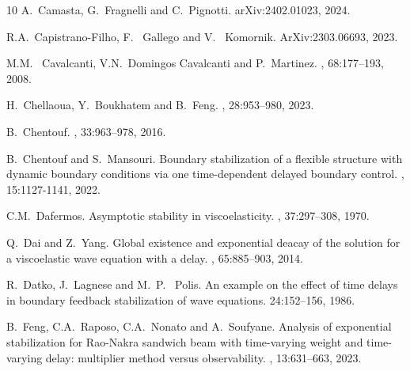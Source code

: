 \documentclass[11pt]{article}
\begin{document}
\begin{thebibliography}{10}
{\sc A.~Camasta, G.~Fragnelli and C.~Pignotti.}
 arXiv:2402.01023, 2024.

{\sc R.A.~Capistrano-Filho, F.~ Gallego and V.~ Komornik.}
  ArXiv:2303.06693,
2023.

{\sc M.M.~ Cavalcanti, V.N.~Domingos Cavalcanti and P.~Martinez.}
, 68:177--193, 2008.

{\sc H.~Chellaoua, Y.~Boukhatem and B.~Feng.}
, 28:953--980, 2023.

{\sc B.~Chentouf.}
, 33:963--978, 2016.

{\sc B.~Chentouf and S.~Mansouri.}
\newblock Boundary stabilization of a flexible structure with dynamic boundary conditions via one time-dependent delayed boundary control.
, 15:1127-1141, 2022.



{\sc C.M.~Dafermos.}
\newblock Asymptotic stability in viscoelasticity.
, 37:297--308, 1970.

{\sc Q.~Dai and Z.~Yang.}
\newblock Global existence and exponential deacay of the solution for a viscoelastic wave equation
with a delay.
, 65:885--903, 2014.

{\sc R.~Datko, J.~Lagnese and M.~P.~ Polis.}
\newblock An example on the effect of time delays in boundary feedback stabilization of wave
equations.
 24:152--156, 1986.


{\sc B.~Feng, C.A.~Raposo, C.A.~Nonato and A.~Soufyane.}
\newblock Analysis of exponential stabilization for Rao-Nakra sandwich beam with time-varying weight and time-varying delay: multiplier method versus observability.
, 13:631--663, 2023.




\end{thebibliography}
\end{document}
